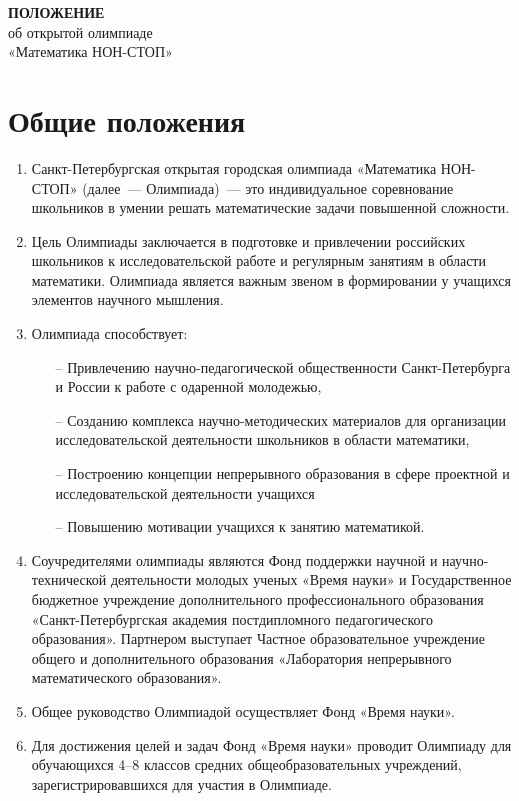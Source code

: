 \documentclass[a4paper,12pt]{article}
\newcommand{\mns}{«Математика НОН-СТОП»\xspace}
\begin{document}


\begin{center} \Large
	{\bf ПОЛОЖЕНИЕ} \\
	об открытой олимпиаде \\
	\mns \\
\end{center}

\section{Общие положения}

\begin{enumerate}
	\item Санкт-Петербургская открытая городская олимпиада «Математика НОН-СТОП» (далее~— Олимпиада)~— это индивидуальное соревнование школьников в умении решать математические задачи повышенной сложности.
	\item Цель Олимпиады заключается в подготовке и привлечении российских школьников к исследовательской работе и регулярным занятиям в области математики. Олимпиада является важным звеном в формировании у учащихся элементов научного мышления.
	\item Олимпиада способствует: \begin{enumerate}
	   \item[–] Привлечению научно-педагогической общественности Санкт-Петербурга и России к работе с одаренной молодежью,
	   \item[–] Созданию комплекса научно-методических материалов для организации исследовательской деятельности школьников в области математики,
	   \item[–] Построению концепции непрерывного образования в сфере проектной и
исследовательской деятельности учащихся
	   \item[–] Повышению мотивации учащихся к занятию математикой.
   \end{enumerate}
	\item Соучредителями олимпиады являются Фонд поддержки научной и научно-технической деятельности молодых ученых «Время науки» и Государственное бюджетное учреждение дополнительного профессионального образования «Санкт-Петербургская академия постдипломного педагогического образования». Партнером выступает Частное образовательное учреждение общего и дополнительного образования «Лаборатория непрерывного математического образования».
	\item Общее руководство Олимпиадой осуществляет Фонд «Время науки». 
	\item Для достижения целей и задач Фонд «Время науки» проводит Олимпиаду для обучающихся 4–8 классов средних общеобразовательных учреждений, зарегистрировавшихся для участия в Олимпиаде.

\end{enumerate}
\end{document}
